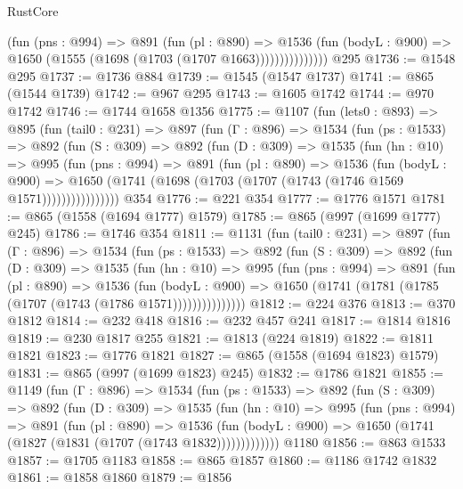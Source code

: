 \begin{lexlean}{RustCore}
\begin{coremodule}
{\begin{coremodule}
{{{{{{{{                    (fun (pns : @994) =>
                    @891
                      (fun (pl : @890) =>
                      @1536
                        (fun (bodyL : @900) =>
                        @1650 (@1555 (@1698 (@1703 (@1707 @1663)))))))))))))))
    @295
@1736 := @1548 @295
@1737 := @1736 @884
@1739 := @1545 (@1547 @1737)
@1741 := @865 (@1544 @1739)
@1742 := @967 @295
@1743 := @1605 @1742
@1744 := @970 @1742
@1746 := @1744 @1658 @1356
@1775 := @1107
    (fun (lets0 : @893) =>
    @895
      (fun (tail0 : @231) =>
      @897
        (fun (Γ : @896) =>
        @1534
          (fun (ps : @1533) =>
          @892
            (fun (S : @309) =>
            @892
              (fun (D : @309) =>
              @1535
                (fun (hn : @10) =>
                @995
                  (fun (pns : @994) =>
                  @891
                    (fun (pl : @890) =>
                    @1536
                      (fun (bodyL : @900) =>
                      @1650 (@1741 (@1698 (@1703 (@1707 (@1743 (@1746 @1569 @1571))))))))))))))))
    @354
@1776 := @221 @354
@1777 := @1776 @1571
@1781 := @865 (@1558 (@1694 @1777) @1579)
@1785 := @865 (@997 (@1699 @1777) @245)
@1786 := @1746 @354
@1811 := @1131
    (fun (tail0 : @231) =>
    @897
      (fun (Γ : @896) =>
      @1534
        (fun (ps : @1533) =>
        @892
          (fun (S : @309) =>
          @892
            (fun (D : @309) =>
            @1535
              (fun (hn : @10) =>
              @995
                (fun (pns : @994) =>
                @891
                  (fun (pl : @890) =>
                  @1536
                    (fun (bodyL : @900) =>
                    @1650 (@1741 (@1781 (@1785 (@1707 (@1743 (@1786 @1571)))))))))))))))
@1812 := @224 @376
@1813 := @370 @1812
@1814 := @232 @418
@1816 := @232 @457 @241
@1817 := @1814 @1816
@1819 := @230 @1817 @255
@1821 := @1813 (@224 @1819)
@1822 := @1811 @1821
@1823 := @1776 @1821
@1827 := @865 (@1558 (@1694 @1823) @1579)
@1831 := @865 (@997 (@1699 @1823) @245)
@1832 := @1786 @1821
@1855 := @1149
    (fun (Γ : @896) =>
    @1534
      (fun (ps : @1533) =>
      @892
        (fun (S : @309) =>
        @892
          (fun (D : @309) =>
          @1535
            (fun (hn : @10) =>
            @995
              (fun (pns : @994) =>
              @891
                (fun (pl : @890) =>
                @1536
                  (fun (bodyL : @900) => @1650 (@1741 (@1827 (@1831 (@1707 (@1743 @1832)))))))))))))
    @1180
@1856 := @863 @1533
@1857 := @1705 @1183
@1858 := @865 @1857
@1860 := @1186 @1742 @1832
@1861 := @1858 @1860
@1879 := @1856
}}}}}}}}
\end{coremodule}}
\end{coremodule}
\end{lexlean}
